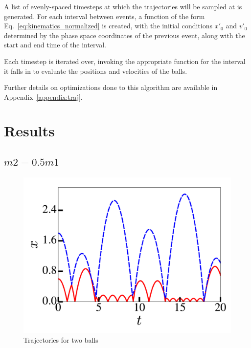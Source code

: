 \documentclass[pra,twocolumn,showpacs,amsmath,amssymb, aps, 10pt]{revtex4-1}
\begin{document}
A list of evenly-spaced timesteps at which the trajectories will be sampled at
is generated. For each interval between events, a function of the form
Eq.~\ref{eq:kinematics_normalized} is created, with the initial conditions $x'_0$
and $v'_0$ determined by the phase space coordinates of the previous event, along
with the start and end time of the interval.

Each timestep is iterated over, invoking the appropriate function for the
interval it falls in to evaluate the positions and velocities of the balls.

Further details on optimizations done to this algorithm are available
in Appendix~\ref{appendix:traj}.





\section{Results} \label{sec:results}



\subsection{$m2 = 0.5 m1$}
\begin{figure}
  \includegraphics[width=0.8\linewidth]{r2_0_traj}
  \caption{Trajectories for two balls}
  \label{fig:0.5-traj}
\end{figure}
\end{document}
